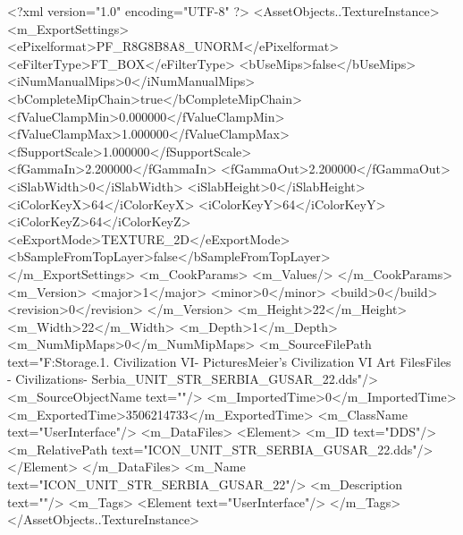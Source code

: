 <?xml version="1.0" encoding="UTF-8" ?>
<AssetObjects..TextureInstance>
	<m_ExportSettings>
		<ePixelformat>PF_R8G8B8A8_UNORM</ePixelformat>
		<eFilterType>FT_BOX</eFilterType>
		<bUseMips>false</bUseMips>
		<iNumManualMips>0</iNumManualMips>
		<bCompleteMipChain>true</bCompleteMipChain>
		<fValueClampMin>0.000000</fValueClampMin>
		<fValueClampMax>1.000000</fValueClampMax>
		<fSupportScale>1.000000</fSupportScale>
		<fGammaIn>2.200000</fGammaIn>
		<fGammaOut>2.200000</fGammaOut>
		<iSlabWidth>0</iSlabWidth>
		<iSlabHeight>0</iSlabHeight>
		<iColorKeyX>64</iColorKeyX>
		<iColorKeyY>64</iColorKeyY>
		<iColorKeyZ>64</iColorKeyZ>
		<eExportMode>TEXTURE_2D</eExportMode>
		<bSampleFromTopLayer>false</bSampleFromTopLayer>
	</m_ExportSettings>
	<m_CookParams>
		<m_Values/>
	</m_CookParams>
	<m_Version>
		<major>1</major>
		<minor>0</minor>
		<build>0</build>
		<revision>0</revision>
	</m_Version>
	<m_Height>22</m_Height>
	<m_Width>22</m_Width>
	<m_Depth>1</m_Depth>
	<m_NumMipMaps>0</m_NumMipMaps>
	<m_SourceFilePath text="F:\Mod Storage\2.1. Civilization VI\Mods\Archive - Pictures\Sid Meier's Civilization VI Art Files\Art Files - Civilizations\Civilization - Serbia\ICON_UNIT_STR_SERBIA_GUSAR_22.dds"/>
	<m_SourceObjectName text=""/>
	<m_ImportedTime>0</m_ImportedTime>
	<m_ExportedTime>3506214733</m_ExportedTime>
	<m_ClassName text="UserInterface"/>
	<m_DataFiles>
		<Element>
			<m_ID text="DDS"/>
			<m_RelativePath text="ICON_UNIT_STR_SERBIA_GUSAR_22.dds"/>
		</Element>
	</m_DataFiles>
	<m_Name text="ICON_UNIT_STR_SERBIA_GUSAR_22"/>
	<m_Description text=""/>
	<m_Tags>
		<Element text="UserInterface"/>
	</m_Tags>
</AssetObjects..TextureInstance>

